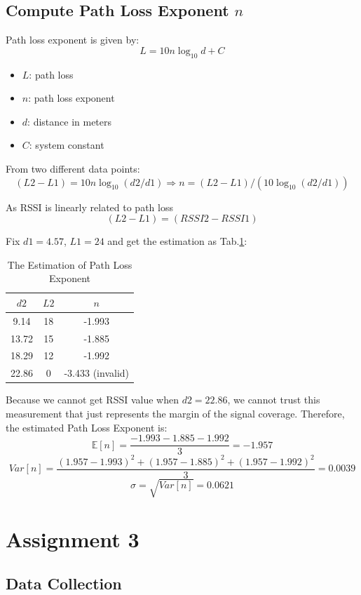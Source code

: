 \documentclass[letterpaper, 12pt]{article}
\begin{document}
\subsection{Compute Path Loss Exponent $n$}

Path loss exponent is given by: $$L=10n\log_{10}d+C$$
\begin{itemize}
	\item $L$: path loss
	\item $n$: path loss exponent
	\item $d$: distance in meters
	\item $C$: system constant
\end{itemize}

From two different data points: $$(L2-L1)=10n\log_{10}(d2/d1) \Rightarrow n=(L2-L1)/(10\log_{10}(d2/d1))$$

As RSSI is linearly related to path loss $$(L2-L1)=(RSSI2-RSSI1)$$

Fix $d1=4.57$, $L1=24$ and get the estimation as Tab.\ref{tab:pathloss}:

\begin{table}[!h]
	\centering
	\caption{The Estimation of Path Loss Exponent}
	\label{tab:pathloss}
	\begin{tabular}{|c|c|c|}
		\hline
		$d2$	&	$L2$	&	$n$	\\
		\hline
		9.14		&	18		&	-1.993	\\
		\hline
		13.72		&	15		&	-1.885	\\
		\hline
		18.29		&	12		&	-1.992	\\
		\hline
		22.86		&	0		&	-3.433 (invalid)	\\
		\hline
	\end{tabular}
\end{table}

Because we cannot get RSSI value when $d2=22.86$, we cannot trust this measurement that just represents the margin of the signal coverage. Therefore, the estimated Path Loss Exponent is:
$$\mathbb{E}[n]=\frac{-1.993-1.885-1.992}{3}=-1.957$$
$$Var[n]=\frac{(1.957-1.993)^2+(1.957-1.885)^2+(1.957-1.992)^2}{3}=0.0039$$
$$\sigma=\sqrt{Var[n]}=0.0621$$

\newpage
\section{Assignment 3}

\subsection{Data Collection}
\end{document}
